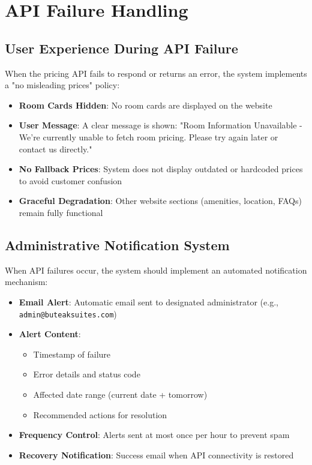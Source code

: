 \documentclass[12pt]{article}
\begin{document}
\section{API Failure Handling}

\subsection{User Experience During API Failure}
When the pricing API fails to respond or returns an error, the system implements a "no misleading prices" policy:

\begin{itemize}
    \item \textbf{Room Cards Hidden}: No room cards are displayed on the website
    \item \textbf{User Message}: A clear message is shown: "Room Information Unavailable - We're currently unable to fetch room pricing. Please try again later or contact us directly."
    \item \textbf{No Fallback Prices}: System does not display outdated or hardcoded prices to avoid customer confusion
    \item \textbf{Graceful Degradation}: Other website sections (amenities, location, FAQs) remain fully functional
\end{itemize}

\subsection{Administrative Notification System}
When API failures occur, the system should implement an automated notification mechanism:

\begin{itemize}
    \item \textbf{Email Alert}: Automatic email sent to designated administrator (e.g., \texttt{admin@buteaksuites.com})
    \item \textbf{Alert Content}: 
    \begin{itemize}
        \item Timestamp of failure
        \item Error details and status code
        \item Affected date range (current date + tomorrow)
        \item Recommended actions for resolution
    \end{itemize}
    \item \textbf{Frequency Control}: Alerts sent at most once per hour to prevent spam
    \item \textbf{Recovery Notification}: Success email when API connectivity is restored
\end{itemize}
\end{document}
